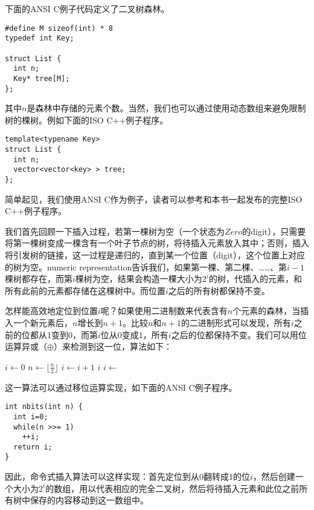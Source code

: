 \documentclass[UTF8]{article}
\begin{document}
下面的ANSI C例子代码定义了二叉树森林。

\lstset{language=C}
\begin{lstlisting}
#define M sizeof(int) * 8
typedef int Key;

struct List {
  int n;
  Key* tree[M];
};
\end{lstlisting}

其中$n$是森林中存储的元素个数。当然，我们也可以通过使用动态数组来避免限制树的棵树。例如下面的ISO C++例子程序。

\lstset{language=C++}
\begin{lstlisting}
template<typename Key>
struct List {
  int n;
  vector<vector<key> > tree;
};
\end{lstlisting}

简单起见，我们使用ANSI C作为例子，读者可以参考和本书一起发布的完整ISO C++例子程序。

我们首先回顾一下插入过程，若第一棵树为空（一个状态为$Zero$的digit），只需要将第一棵树变成一棵含有一个叶子节点的树，将待插入元素放入其中；否则，插入将引发树的链接，这一过程是递归的，直到某一个位置（digit），这个位置上对应的树为空。numeric representation告诉我们，如果第一棵、第二棵、……、第$i-1$棵树都存在，而第$i$棵树为空，结果会构造一棵大小为$2^i$的树，代插入的元素，和所有此前的元素都存储在这棵树中。而位置$i$之后的所有树都保持不变。

怎样能高效地定位到位置$i$呢？如果使用二进制数来代表含有$n$个元素的森林，当插入一个新元素后，$n$增长到$n+1$。比较$n$和$n+1$的二进制形式可以发现，所有$i$之前的位都从1变到0，而第$i$位从0变成1，所有$i$之后的位都保持不变。我们可以用位运算异或（$\oplus$）来检测到这一位，算法如下：

\begin{algorithmic}
  \State $i \gets 0$
    \State $ n \gets \lfloor \frac{n}{2} \rfloor$
    \State $ i \gets i + 1$
  \EndWhile
  \State \Return $i$
\EndFunction
\Statex
\State $i \gets $ 
\end{algorithmic}

这一算法可以通过移位运算实现，如下面的ANSI C例子程序。

\begin{lstlisting}
int nbits(int n) {
  int i=0;
  while(n >>= 1)
    ++i;
  return i;
}
\end{lstlisting}

因此，命令式插入算法可以这样实现：首先定位到从0翻转成1的位$i$，然后创建一个大小为$2^i$的数组，用以代表相应的完全二叉树，然后将待插入元素和此位之前所有树中保存的内容移动到这一数组中。
\end{document}
